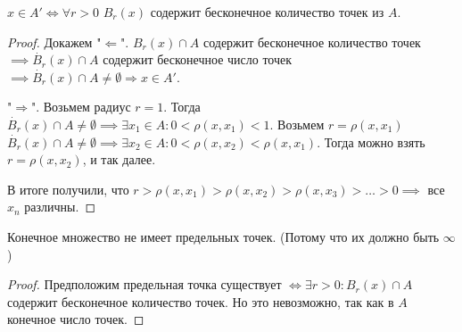 \begin{theorem}
    $x \in A' \iff \forall r > 0$  $B_r(x)$ содержит бесконечное количество точек из  $A$.
\end{theorem}
\begin{proof}
    Докажем "$\Leftarrow$". $B_r(x) \cap A$ содержит бесконечное количество точек  $\implies \dot{B_r}(x) \cap A$ содержит бесконечное число точек  $\implies \dot{B_r}(x) \cap A \neq \emptyset \Rightarrow x \in A'$.

     "$\Rightarrow$". Возьмем радиус  $r = 1$. Тогда  $\dot{B_r}(x) \cap A \neq \emptyset \implies \exists x_1 \in A\!: 0 < \rho(x, x_1) < 1$. Возьмем $r = \rho(x, x_1)$ $\dot{B_r}(x) \cap A \neq \emptyset \implies \exists x_2 \in A\!: 0 < \rho(x, x_2) < \rho(x, x_1)$. Тогда можно взять $r = \rho(x, x_2)$, и так далее. 

     В итоге получили, что $r > \rho(x, x_1) > \rho(x, x_2) > \rho(x, x_3) > \ldots > 0 \implies$ все $x_n$ различны.
\end{proof}
\begin{consequence}
     Конечное множество не имеет предельных точек. (Потому что их должно быть $\infty$)
\end{consequence}
\begin{proof}
     Предположим предельная точка существует $\iff \exists r > 0\!: B_r(x) \cap A$ содержит бесконечное количество точек. Но это невозможно, так как в $A$ конечное число точек.
\end{proof}

